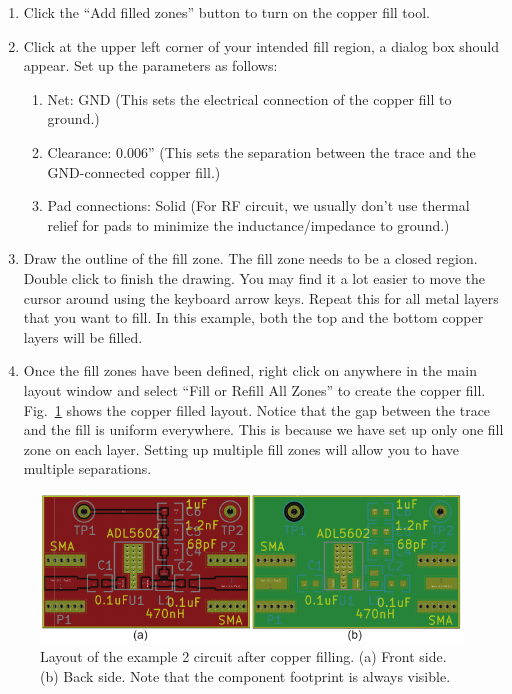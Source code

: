 \documentclass[12pt,letterpaper]{scrartcl}
\begin{document}
\begin{enumerate}
	\item Click the ``Add filled zones'' button to turn on the copper fill tool. 
	
	\item Click at the upper left corner of your intended fill region, a dialog box should appear. Set up the parameters as follows: 
		\begin{enumerate}
			\item Net: GND (This sets the electrical connection of the copper fill to ground.)
			
			\item Clearance: 0.006'' (This sets the separation between the trace and the GND-connected copper fill.)
			
			\item Pad connections: Solid (For RF circuit, we usually don't use thermal relief for pads to minimize the inductance/impedance to ground.)
		\end{enumerate}
	\item Draw the outline of the fill zone. The fill zone needs to be a closed region. Double click to finish the drawing. You may find it a lot easier to move the cursor around using the keyboard arrow keys. Repeat this for all metal layers that you want to fill. In this example, both the top and the bottom copper layers will be filled. 
	
	\item Once the fill zones have been defined, right click on anywhere in the main layout window and select ``Fill or Refill All Zones'' to create the copper fill. Fig.~\ref{fig:example2-layout-fill} shows the copper filled layout. Notice that the gap between the trace and the fill is uniform everywhere. This is because we have set up only one fill zone on each layer. Setting up multiple fill zones will allow you to have multiple separations. 
	
\end{enumerate}

	\begin{figure}[ht]
		\centering
		\includegraphics[width=6in]{example2-layout-fill}
		\caption{Layout of the example 2 circuit after copper filling. (a) Front side. (b) Back side. Note that the component footprint is always visible.}
		\label{fig:example2-layout-fill}
	\end{figure}
	
\end{document}
